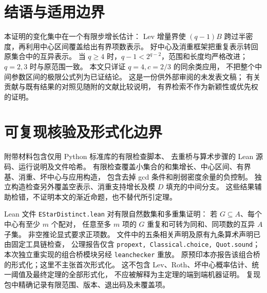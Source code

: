 \documentclass[UTF8,a4paper,11pt,fontset=none]{ctexart}
\theoremstyle{remark}
\begin{document}
\section{结语与适用边界}
本证明的变化集中在一个有限步增长估计：
Lev 增量界使 $(q-1)B$ 跨过半密度，再利用中心区间覆盖给出有界项数表示。
好中心及消重框架把重复表示转回原集合中的互异表示。
当 $q\ge4$ 时，$q-1<2^{q-2}$，范围和长度均严格改进；
$q=2,3$ 时与原范围一致。
本文只详证 $q=4,c=2/3$ 的同余类应用，
不把整个中间参数区间的极限公式列为已证结论。
这是一份供外部审阅的未发表文稿；
有关贡献与既有结果的对照见随附的文献比较说明，
有界检索不作为新颖性或优先权的证明。

\appendix
\section{可复现核验及形式化边界}\label{sec:verify}
附带材料包含仅用 Python 标准库的有限检查脚本、
去重桥与算术步骤的 Lean 源码、运行说明及文件哈希。
有限检查覆盖小集合的和集增长、中心区间、有界基、消重、坏中心与应用构造，
包含去掉 gcd 条件和削弱密度余量的负控制。
独立构造检查另外覆盖空表示、消重支持增长及模 $D$ 填充的中间分支。
这些结果辅助检错，不证明本文的渐近命题，也不替代所引定理。

Lean 文件 \texttt{EStarDistinct.lean} 对有限自然数集和多重集证明：
若 $G\subseteq A$、每个中心有至少 $m$ 个配对，
任意至多 $m$ 项的 $G$ 重复和可转为同和、同项数的互异 $A$ 子集。
非空推论显式要求正项数。
文件中的五条相关声明及原有九条算术声明已由固定工具链检查，
公理报告仅含 \texttt{propext, Classical.choice, Quot.sound}；
本次独立重实现的组合桥模块另经 \texttt{leanchecker} 重放。
原预印本亦报告该组合桥的形式化；这里不主张首次形式化。
这不包含 Lev、Roth、坏中心概率估计、统一阈值及最终定理的全部形式化，
不应被解释为主定理的端到端机器证明。
复现包中精确记录有限范围、版本、退出码及未覆盖项。
\end{document}
